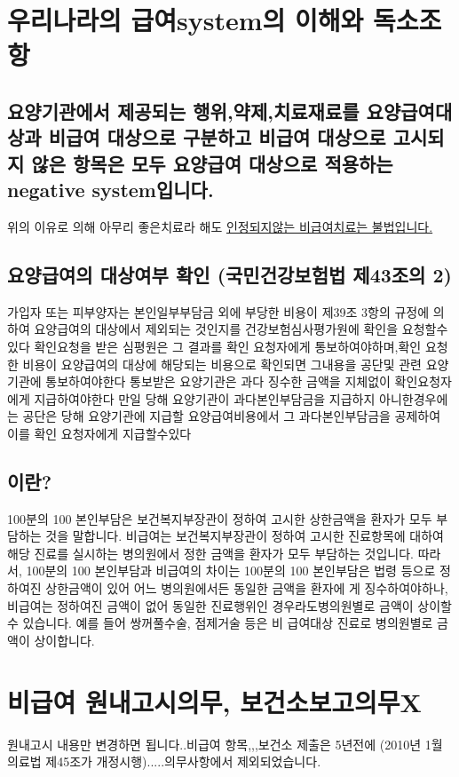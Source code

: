 \section{우리나라의 급여system의 이해와 독소조항}
\subsection{요양기관에서 제공되는 행위,약제,치료재료를 요양급여대상과 비급여 대상으로 구분하고 비급여 대상으로 고시되지 않은 항목은 모두 요양급여 대상으로 적용하는 negative system입니다.}
위의 이유로 의해 아무리 좋은치료라 해도 \uline{인정되지않는 비급여치료는 불법입니다.}
\subsection{요양급여의 대상여부 확인 (국민건강보험법 제43조의 2)}
가입자 또는 피부양자는 본인일부부담금
   외에 부당한 비용이 제39조 3항의 규정에 의하여 요양급여의 대상에서 제외되는 것인지를 건강보험심사평가원에 확인을 요청할수 있다
 확인요청을 받은 심평원은 그 결과를 확인 요청자에게 통보하여야하며,확인 요청한 비용이 요양급여의 대상에 해당되는 비용으로 확인되면 그내용을 공단및 관련 요양기관에 통보하여야한다 
통보받은 요양기관은 과다 징수한 금액을 지체없이 확인요청자에게 지급하여야한다
만일 당해 요양기관이 과다본인부담금을 지급하지 아니한경우에는 공단은 당해 요양기관에 지급할 요양급여비용에서 그 과다본인부담금을 공제하여 이를 확인 요청자에게 지급할수있다
\subsection{이란?}
100분의 100 본인부담은 보건복지부장관이 정하여 고시한 상한금액을 환자가 모두 부담하는 것을 말합니다. 
비급여는 보건복지부장관이 정하여 고시한 진료항목에 대하여 해당 진료를 실시하는 병의원에서 정한 금액을 환자가 모두 부담하는 것입니다.
따라서, 100분의 100 본인부담과 비급여의 차이는 100분의 100 본인부담은 법령 등으로 정하여진 상한금액이 있어 어느 병\cntrdot{}의원에서든 동일한 금액을 환자에
게 징수하여야하나, 비급여는 정하여진 금액이 없어 동일한 진료행위인 경우라도병\cntrdot{}의원별로 금액이 상이할 수 있습니다. 예를 들어 쌍꺼풀수술, 점제거술 등은 비
급여대상 진료로 병\cntrdot{}의원별로 금액이 상이합니다.
 

\section{비급여 원내고시의무, 보건소보고의무X}
원내고시 내용만 변경하면 됩니다..비급여 항목,,,보건소 제출은 5년전에 (2010년 1월 의료법 제45조가 개정\cntrdot{}시행).....의무사항에서 제외되었습니다.

